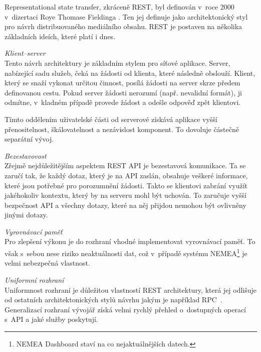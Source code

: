 Representational state transfer, zkráceně REST, byl definován v~roce 2000 v~dizertaci Roye Thomase Fieldinga \cite{rest}. Ten jej definuje jako architektonický styl pro návrh distribuovaného mediálního obsahu. REST je postaven na několika základních ideích, které platí i dnes.

\begin{description}
    \item \textit{Klient--server} \\
        Tento návrh architektury je základním stylem pro síťové aplikace. Server, nabízející sadu služeb, čeká na žádosti od klienta, které následně obslouží. Klient, který se snaží vykonat určitou činnost, posílá žádosti na server skrze předem definovanou cestu. Pokud server žádosti nerozumí (např. nevalidní formát), ji odmítne, v~kladném případě provede žádost a odešle odpověď zpět klientovi.

        Tímto oddělením uživatelské části od serverové získává aplikace vyšší přenositelnost, škálovatelnost a nezávislost komponent. To dovoluje částečně separátní vývoj.
       
    \item \textit{Bezestavovost} \\
        Zřejmě nejdůležitějším aspektem REST API je bezestavová komunikace. Ta se zaručí tak, že každý dotaz, který je na API zaslán, obsahuje veškeré informace, které jsou potřebné pro porozumnění žádosti. Takto se klientovi zabrání využít jakéhokoliv kontextu, který by na serveru mohl být uchován. To zaručuje vyšší bezpečnost API a všechny dotazy, které na něj přijdou nemohou být ovlivněny jinými dotazy.
       
    \item \textit{Vyrovnávací paměť} \\
        Pro zlepšení výkonu je do rozhraní vhodné implementovat vyrovnávací paměť. To však s~sebou nese riziko neaktuálnosti dat, což v~případě systému NEMEA\footnote{NEMEA Dashboard staví na co nejaktuálnějších datech.} je velmi nebezpečná vlastnost.
       
    \item \textit{Uniformní rozhraní} \\
        Uniformnost rozhraní je důležitou vlastností REST architektury, která jej odlišuje od ostatních architektonických stylů návrhu jakým je například RPC~\cite{restful}. Generalizací rozhraní vývojář získá velmi rychlý přehled o~dostupných operací s~API a jaké služby poskytují.
        

\end{description}

